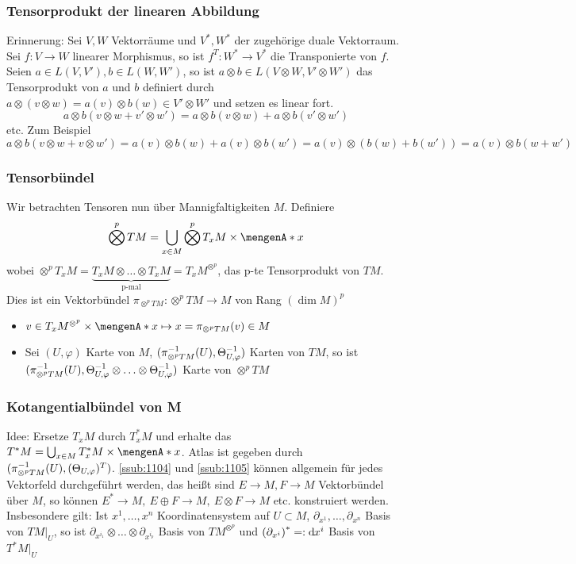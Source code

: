 \subsubsection{Tensorprodukt der linearen Abbildung}
\label{ssub:172}
Erinnerung: Sei $V, W$ Vektorräume und $V^*,W^*$ der zugehörige duale Vektorraum. Sei $f:V\to W$ linearer Morphismus, so ist $f^T: W^*\to V^*$ die Transponierte von $f$. Seien $a\in L(V,V'), b\in L(W,W')$, so ist $a\otimes b \in L(V\otimes W,V'\otimes W')$ das Tensorprodukt von $a$ und $b$ definiert durch $a\otimes(v\otimes w) = a(v)\otimes b(w)\in V'\otimes W'$ und setzen es linear fort.
\[
a\otimes b (v\otimes w +v'\otimes w') = a\otimes b(v\otimes w) + a\otimes b(v'\otimes w')
\]
etc. Zum Beispiel
\[
a\otimes b (v\otimes w +v\otimes w') = a(v)\otimes b(w) + a(v)\otimes b(w') = a(v)\otimes (b(w)+b(w')) = a(v)\otimes b(w+w')
\]

\subsubsection{Tensorbündel}
\label{ssub:173}
Wir betrachten Tensoren nun über Mannigfaltigkeiten $M$. Definiere
\[
\bigotimes^p TM = \bigcup_{x\in M} \bigotimes^p T_x M\times \set{x}
\]
wobei $\otimes^p T_x M = \underbrace{T_x M \otimes \ldots \otimes T_x M}_{\text{p-mal}} = T_x M^{\otimes^p}$, das p-te Tensorprodukt von $TM$. Dies ist ein Vektorbündel $\pi_{\otimes^p TM}: \otimes^p TM\to M$ von Rang $(\dim M)^p$
\begin{itemize}
\item $v\in T_x M^{\otimes^p}\times \set{x} \mapsto x = \pi_{\otimes^p TM}(v) \in M$
\item Sei $(U,\varphi)$ Karte von $M$, $\enbrace{\pi_{\otimes^p TM}^{-1}(U), \Theta_{U,\varphi}^{-1}}$ Karten von $TM$, so ist $\enbrace{\pi_{\otimes^p TM}^{-1}(U), \Theta^{-1}_{U,\varphi}\otimes \ldots \otimes \Theta^{-1}_{U,\varphi}}$ Karte von $\otimes^p TM$
\end{itemize} 

\subsubsection{Kotangentialbündel von M}
\label{ssub:174}
Idee: Ersetze $T_x M$ durch $T_x^* M$ und erhalte das  $T^* M = \bigcup_{x\in M} T_x^* M \times \set{x}$. Atlas ist gegeben durch $\enbrace{\pi_{\otimes^p TM}^{-1}(U), \enbrace{\Theta_{U,\varphi}}^{T}}$. \ref{ssub:1104} und \ref{ssub:1105} können allgemein für jedes Vektorfeld durchgeführt werden, das heißt sind $E\to M, F\to M$ Vektorbündel über $M$, so können $E^*\to M,\ E\oplus F\to M,\ E\otimes F\to M$ etc. konstruiert werden.
Insbesondere gilt: Ist $x^1,\ldots,x^n$ Koordinatensystem auf $U\subset M$, $\partial_{x^1},\ldots, \partial_{x^n}$ Basis von $TM\vert_U$, so ist $\partial_{x^{i_1}}\otimes \ldots \otimes \partial_{x^{i_p}}$ Basis von $TM^{\otimes^p}$ und $\enbrace*{\partial_{x^i}}^* =: \mathd x^i$ Basis von $T^* M\vert_U$

